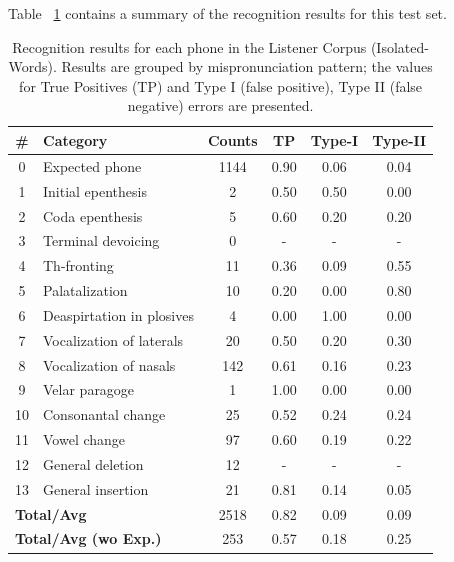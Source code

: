 \documentclass[twocolumn]{bmcart}%
\begin{document}
Table ~\ref{rec-listener-words} contains a summary of the recognition results for this test set.

\small
\setlength{\tabcolsep}{0.3em}
\begin{table}[ht!]
\caption{Recognition results for each phone in the Listener Corpus (Isolated-Words). Results are grouped by mispronunciation pattern; the values for True Positives (TP) and Type I (false positive), Type II (false negative) errors are presented.}
\begin{tabular}{clcccc} \hline
\textbf{\#} & \textbf{Category} & \textbf{Counts} & \textbf{TP} & \textbf{Type-I} & \textbf{Type-II} \\ \hline
0 & Expected phone & 1144 & 0.90 & 0.06 & 0.04 \\ 
1 & Initial epenthesis & 2 & 0.50 & 0.50 & 0.00 \\ 
2 & Coda epenthesis & 5 & 0.60 & 0.20 & 0.20 \\ 
3 & Terminal devoicing & 0 & - & - & - \\ 
4 & Th-fronting & 11 & 0.36 & 0.09 & 0.55 \\ 
5 & Palatalization & 10 & 0.20 & 0.00 & 0.80 \\ 
6 & Deaspirtation in plosives & 4 & 0.00 & 1.00 & 0.00 \\ 
7 & Vocalization of laterals & 20 & 0.50 & 0.20 & 0.30 \\ 
8 & Vocalization of nasals & 142 & 0.61 & 0.16 & 0.23 \\ 
9 & Velar paragoge & 1 & 1.00 & 0.00 & 0.00 \\ 
10 & Consonantal change & 25 & 0.52 & 0.24 & 0.24 \\ 
11 & Vowel change & 97 & 0.60 & 0.19 & 0.22 \\ 
12 & General deletion & 12 & - & - & - \\ 
13 & General insertion & 21 & 0.81 & 0.14 & 0.05 \\ \hline 
\multicolumn{2}{l}{\textbf{Total/Avg}} & 2518 & 0.82 & 0.09 & 0.09 \\ 
\multicolumn{2}{l}{\textbf{Total/Avg (wo Exp.)}} & 253 & 0.57 & 0.18 & 0.25 \\ \hline
\end{tabular}
\label{rec-listener-words}
\end{table}
\normalsize
\end{document}
